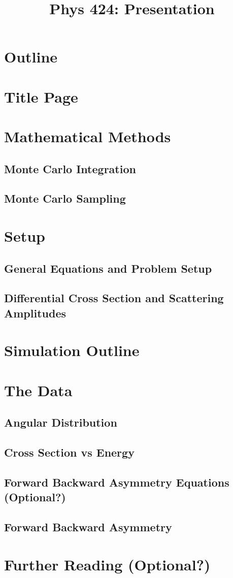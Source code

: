 \documentclass{beamer}
\title{Phys 424: Presentation}
\begin{document}
\begin{frame}
    \titlepage
\end{frame}

\section*{Outline}
\begin{frame}
    \tableofcontents
\end{frame}

\section{Title Page}

\section{Mathematical Methods}
\subsection{Monte Carlo Integration}
\subsection{Monte Carlo Sampling}

\section{Setup}
\subsection{General Equations and Problem Setup}
\subsection{Differential Cross Section and Scattering Amplitudes}

\section{Simulation Outline}

\section{The Data}
\subsection{Angular Distribution}
\subsection{Cross Section vs Energy}
\subsection{Forward Backward Asymmetry Equations (Optional?)}
\subsection{Forward Backward Asymmetry}

\section{Further Reading (Optional?)}

\begin{frame}
\end{frame}
\end{document}
